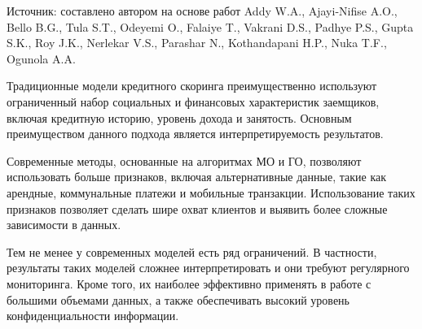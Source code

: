 \begin{center}
	\begin{minipage}{\textwidth}
	\fontsize{9}{11}\selectfont
	\justifying
	Источник: составлено автором на основе работ Addy W.A., Ajayi-Nifise A.O., Bello B.G., Tula S.T., Odeyemi O., Falaiye T., Vakrani D.S., Padhye P.S., Gupta S.K., Roy J.K., Nerlekar V.S., Parashar N., Kothandapani H.P., Nuka
	T.F., Ogunola A.A.
\end{minipage}
\end{center}

Традиционные модели кредитного скоринга преимущественно используют ограниченный набор социальных и финансовых характеристик заемщиков, включая кредитную историю, уровень дохода и занятость. Основным преимуществом данного подхода является интерпретируемость результатов. 

Современные методы, основанные на алгоритмах МО и ГО, позволяют использовать больше признаков, включая альтернативные данные, такие как арендные, коммунальные платежи и мобильные транзакции. Использование таких признаков позволяет сделать шире охват клиентов и выявить более сложные зависимости в данных.

Тем не менее у современных моделей есть ряд ограничений. В частности, результаты таких моделей сложнее интерпретировать и они требуют регулярного мониторинга. Кроме того, их наиболее эффективно применять в работе с большими объемами данных, а также обеспечивать высокий уровень конфиденциальности информации.

